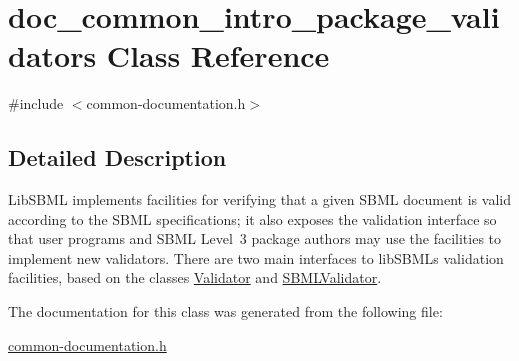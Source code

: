 \hypertarget{classdoc__common__intro__package__validators}{}\section{doc\+\_\+common\+\_\+intro\+\_\+package\+\_\+validators Class Reference}
\label{classdoc__common__intro__package__validators}


{\ttfamily \#include $<$common-\/documentation.\+h$>$}



\subsection{Detailed Description}
\begin{DoxyParagraph}{}
Lib\+S\+B\+ML implements facilities for verifying that a given S\+B\+ML document is valid according to the S\+B\+ML specifications; it also exposes the validation interface so that user programs and S\+B\+ML Level~3 package authors may use the facilities to implement new validators. There are two main interfaces to lib\+S\+B\+ML\textquotesingle{}s validation facilities, based on the classes \hyperlink{class_validator}{Validator} and \hyperlink{class_s_b_m_l_validator}{S\+B\+M\+L\+Validator}. 
\end{DoxyParagraph}


The documentation for this class was generated from the following file\+:\begin{DoxyCompactItemize}
\item 
\hyperlink{common-documentation_8h}{common-\/documentation.\+h}\end{DoxyCompactItemize}
